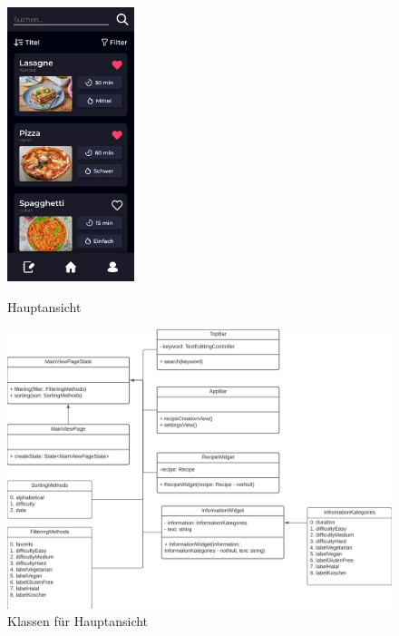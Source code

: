 \documentclass[parskip=full]{scrartcl}
\begin{document}
    \begin{figure}[htp]
    \begin{minipage}
        [t]{0.49\textwidth}
        \centering
        \includegraphics[height=80mm]{entwurfsheft/images/Presentation-layer/MainView.jpg}
        \caption{Hauptansicht}
        \end{minipage}
    \begin{minipage}
        [t]{0.49\textwidth}
        \centering
        \includegraphics[height=0.95\textwidth]{entwurfsheft/images/Presentation-layer/MainViewClass.png}
        \caption{Klassen für Hauptansicht}
    \end{minipage}
\end{figure}
\end{document}
